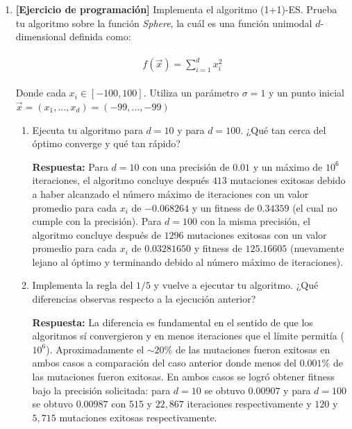 \documentclass[10pt,letterpaper]{article}
\begin{document}
\begin{enumerate}
    \clearpage
    \item \textbf{[Ejercicio de programación]} Implementa el algoritmo (1+1)-ES. Prueba
          tu algoritmo sobre la función \textit{Sphere}, la cuál es una función unimodal
          $d$-dimensional definida como:

        \begin{equation*} \begin{split} \begin{gathered}
            f(\vec{x}) = \sum_{i=1}^d x_i^2
        \end{gathered} \end{split} \end{equation*}

        Donde cada $x_i \in [-100, 100]$. Utiliza un parámetro $\sigma = 1$ y un punto
        inicial $\vec{x} = (x_1, ..., x_d) = (-99,...,-99)$

        \begin{enumerate}
            \item Ejecuta tu algoritmo para $d=10$ y para $d=100$. ¿Qué tan cerca del óptimo
            converge y qué tan rápido?

            \textbf{Respuesta:} Para $d=10$ con una precisión de $0.01$ y un máximo de $10^6$ iteraciones,
            el algoritmo concluye después $413$ mutaciones exitosas debido a haber alcanzado el número
            máximo de iteraciones con un valor promedio para cada $x_i$ de $-0.068264$
            y un fitness de $0.34359$ (el cual no cumple con la precisión).
            Para $d=100$ con la misma precisión, el algoritmo concluye después de $1296$
            mutaciones exitosas con un valor promedio para cada $x_i$ de $0.03281650$ y fitness de
            $125.16605$ (nuevamente lejano al óptimo y terminando debido al número máximo de iteraciones).

            \item Implementa la regla del $1/5$ y vuelve a ejecutar tu algoritmo. ¿Qué diferencias
            observas respecto a la ejecución anterior?

            \textbf{Respuesta:} La diferencia es fundamental en el sentido de que los algoritmos sí
            convergieron y en menos iteraciones que el límite permitía ($10^6$). Aproximadamente
            el $\sim 20\%$ de las mutaciones fueron exitosas en ambos casos a comparación del caso
            anterior donde menos del $0.001\%$ de las mutaciones fueron exitosas. En ambos casos se
            logró obtener fitness bajo la precisión solicitada: para $d=10$ se obtuvo $0.00907$ y para
            $d=100$ se obtuvo $0.00987$ con $515$ y $22,867$ iteraciones respectivamente y $120$ y $5,715$
            mutaciones exitosas respectivamente.
        \end{enumerate}


\end{enumerate}
\end{document}
